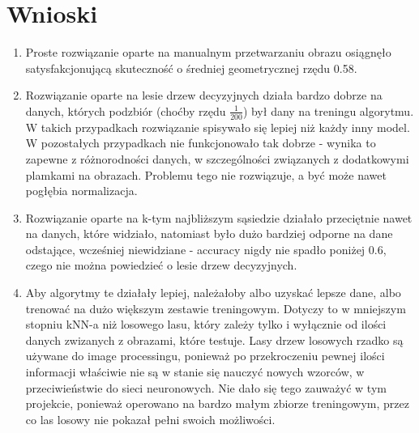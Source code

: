 \documentclass[12pt]{article}
\begin{document}
\section{Wnioski}
\begin{enumerate}
	\item Proste rozwiązanie oparte na manualnym przetwarzaniu obrazu osiągnęło satysfakcjonującą skuteczność o średniej geometrycznej rzędu 0.58. 
	
	\item Rozwiązanie oparte na lesie drzew decyzyjnych działa bardzo dobrze na danych, których podzbiór (choćby rzędu \(\frac{1}{200}\)) był dany na treningu algorytmu. W takich przypadkach rozwiązanie spisywało się lepiej niż każdy inny model. W pozostałych przypadkach nie funkcjonowało tak dobrze - wynika to zapewne z różnorodności danych, w szczególności związanych z dodatkowymi plamkami na obrazach. Problemu tego nie rozwiązuje, a być może nawet pogłębia normalizacja.
	
	\item Rozwiązanie oparte na k-tym najbliższym sąsiedzie działało przeciętnie nawet na danych, które widziało, natomiast było dużo bardziej odporne na dane odstające, wcześniej niewidziane - accuracy nigdy nie spadło poniżej 0.6, czego nie można powiedzieć o lesie drzew decyzyjnych.
	
	\item Aby algorytmy te działały lepiej, należałoby albo uzyskać lepsze dane, albo trenować na dużo większym zestawie treningowym. Dotyczy to w mniejszym stopniu kNN-a niż losowego lasu, który zależy tylko i wyłącznie od ilości danych zwizanych z obrazami, które testuje. Lasy drzew losowych rzadko są używane do image processingu, ponieważ po przekroczeniu pewnej ilości informacji właściwie nie są w stanie się nauczyć nowych wzorców, w przeciwieństwie do sieci neuronowych. Nie dało się tego zauważyć w tym projekcie, ponieważ operowano na bardzo małym zbiorze treningowym, przez co las losowy nie pokazał pełni swoich możliwości.
\end{enumerate}
\end{document}
